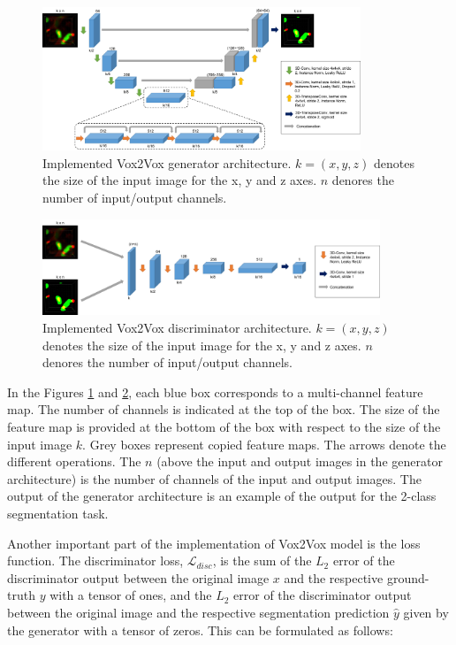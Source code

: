\begin{figure}[!htb]
  \centering
  \includegraphics[width=0.85\textwidth]{Images/Picture2.jpg}
  \caption[Implemented Vox2Vox generator architecture.]{Implemented Vox2Vox generator architecture. $k=(x,y,z)$ denotes the size of the input image for the x, y and z axes. $n$ denores the number of input/output channels.}
  \label{fig:genvox}
\end{figure}

\begin{figure}[!htb]
  \centering
  \includegraphics[width=0.90\textwidth]{Images/discriminator_vox.jpg}
  \caption[Implemented Vox2Vox discriminator architecture.]{Implemented Vox2Vox discriminator architecture. $k=(x,y,z)$ denotes the size of the input image for the x, y and z axes. $n$ denores the number of input/output channels.}
  \label{fig:discvox}
\end{figure}

In the Figures \ref{fig:genvox} and \ref{fig:discvox}, each blue box corresponds to a multi-channel feature map. The number of channels is indicated at the top of the box. The size of the feature map is provided at the bottom of the box with respect to the size of the input image $k$. Grey boxes represent copied feature maps. The arrows denote the different operations. The $n$ (above the input and output images in the generator architecture) is the number of channels of the input and output images. The output of the generator architecture is an example of the output for the 2-class segmentation task.

Another important part of the implementation of Vox2Vox model is the loss function. The discriminator loss, $\mathcal{L}_{disc}$, is the sum of the $L_2$ error of the discriminator output between the original image $x$ and the respective ground-truth $y$ with a tensor of ones, and the $L_2$ error of the discriminator output between the original image and the respective segmentation prediction $\hat{y}$ given by the generator with a tensor of zeros. This can be formulated as follows:


